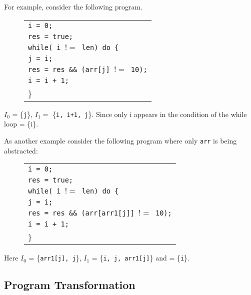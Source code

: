 For example, consider the following program.

\begin{figure}[H]
  \centering
  \begin{tabular}{l}
    {\tt i = 0;} \\
    {\tt res = true;} \\
    {\tt while( i $!=$ len) do \{}  \\
    \hspace{1cm} {\tt j = i;} \\
    \hspace{1cm} {\tt res = res \&\& (arr[j] $!=$ 10);} \\
    \hspace{1cm}  {\tt i = i + 1;} \\
    \}\\
    \end{tabular}
\end{figure}
      
\(I_0\) = \{{\tt j}\}, \(I_1 =\) \{{\tt i, i+1, j}\}. Since only i appears in the condition of the while loop \indexids = \{i\}.

As another example consider the following program where only {\tt arr} is being abstracted:

\begin{figure}[H]
  \centering
  \begin{tabular}{l}
    {\tt i = 0;} \\
    {\tt res = true;} \\
    {\tt while( i $!=$ len) do \{}  \\
    \hspace{1cm} {\tt j = i;} \\
    \hspace{1cm} {\tt res = res \&\& (arr[arr1[j]] $!=$ 10);} \\
    \hspace{1cm}  {\tt i = i + 1;} \\
    \}\\
    \end{tabular}
\end{figure}

Here \(I_0\) = \{{\tt arr1[j], j}\}, \(I_1\) = \{{\tt i, j, arr1[j]}\} and \indexids = \{{\tt i}\}.



\subsection{Program Transformation}

